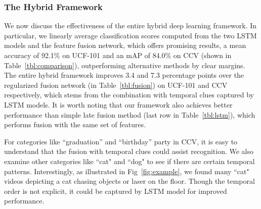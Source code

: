 \documentclass[journal]{IEEEtran}
\begin{document}
\subsubsection{The Hybrid Framework}
We now discuss the effectiveness of the entire hybrid deep learning framework. In particular, we linearly average classification scores computed from the two LSTM models and the feature fusion network, which offers promising results, a mean accuracy of 92.1\% on UCF-101 and an mAP of 84.0\% on CCV (shown in Table~\ref{tbl:comparison}), outperforming alternative methods by clear margins. The entire hybrid framework improves 3.4 and 7.3 percentage points over the regularized fusion network (in Table~\ref{tbl:fusion}) on UCF-101 and CCV respectively, which stems from the combination with temporal clues captured by LSTM models. It is worth noting that our framework also achieves better performance than simple late fusion method (last row in Table~\ref{tbl:lstm}), which performs fusion with the same set of features.
 
For categories like ``graduation'' and ``birthday'' party in CCV, it is easy to understand that the fusion with temporal clues could assist recognition. We also examine other categories like ``cat" and ``dog" to see if there are certain temporal patterns. Interestingly, as illustrated in Fig~\ref{fig:example}, we found many ``cat" videos depicting a cat chasing objects or laser on the floor. Though the temporal order is not explicit, it could be captured by LSTM model for improved performance.

\end{document}
